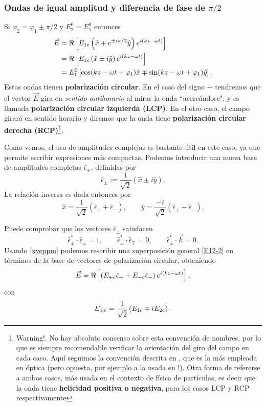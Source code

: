 \subsubsection{Ondas de igual amplitud y diferencia de fase de $\pi/2$}
 Si $\varphi_2=\varphi_1\pm\pi/2$ y $E_{2}^0=E_{1}^0$ entonces
\begin{align}
\vec{E} &= \Re\left[E_{1\rm c}\left(\hat{x}+ e^{\pm i\pi/2}\hat{y}\right) e^{i(kz-\omega t)}\right] \\
&= \Re\left[E_{1\rm c}\left(\hat{x}\pm i\hat{y}\right) e^{i(kz-\omega t)}\right]\\
&= E_{1}^0\left[\cos(kz-\omega t+\varphi_1)\hat{x} \mp \sin(kz-\omega t+\varphi_1)\hat{y}\right].
\end{align}
Estas ondas tienen \textbf{polarización circular}. En el caso del signo $+$ tendremos que el vector $\vec{E}$ gira en \textit{sentido antihorario} al mirar la onda ``acercándose", y es llamada \textbf{polarización circular izquierda (LCP)}. En el otro caso, el campo girará en sentido horario y diremos que la onda tiene \textbf{polarización circular derecha (RCP)}\footnote{Warning!. No hay absoluto consenso sobre esta convención de nombres, por lo que es siempre recomendable verificar la orientación del giro del campo en cada caso. Aquí seguimos la convención descrita en \cite{Jackson}, que es la más empleada en óptica (pero opuesta, por ejemplo a la usada en \cite{Griffiths2013}!). Otra forma de refererse a ambos casos, más usada en el contexto de física de partículas, es decir que la onda tiene \textbf{helicidad positiva o negativa}, para los casos LCP y RCP respectivamente}.

Como vemos, el uso de amplitudes complejas es bastante útil en este caso, ya que permite escribir expresiones más compactas. Podemos introducir una nueva base de amplitudes completas $\hat\epsilon_\pm$, definidas por
\begin{equation}
\hat\epsilon_\pm := \frac{1}{\sqrt{2}}(\hat{x}\pm i\hat{y}).
\end{equation}
La relación inversa es dada entonces por
\begin{equation}\label{xyeppm}
\hat{x}=\frac{1}{\sqrt{2}}(\hat\epsilon_+ + \hat\epsilon_-), \qquad \hat{y}=\frac{-i}{\sqrt{2}}(\hat\epsilon_+ - \hat\epsilon_-).
\end{equation}

Puede comprobar que los vectores $\hat\epsilon_\pm$ satisfacen
\begin{equation}
\hat\epsilon_\pm^*\cdot\hat\epsilon_\pm = 1, \qquad
\hat\epsilon_\pm^*\cdot\hat\epsilon_\mp = 0, \qquad 
\hat\epsilon_\pm^*\cdot\vec{k} = 0.
\end{equation}
Usando \eqref{xyeppm} podemos rescribir una superposición general \eqref{E12-2} en términos de la base de vectores de polarización circular, obteniendo
\begin{equation}
\vec{E} = \Re\left[\left(E_{+\rm c}\hat\epsilon_+ + E_{-\rm c}\hat\epsilon_-\right)e^{i(kz-\omega t)}\right],
\end{equation}
con
\begin{equation}
E_{\pm\rm c} = \frac{1}{\sqrt{2}}\left(E_{1\rm c}\mp iE_{2\rm c}\right).
\end{equation}


